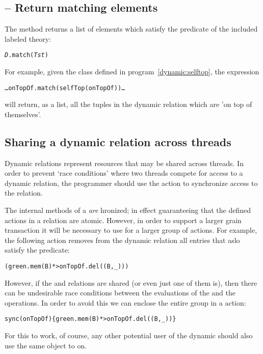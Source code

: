 \subsection{ -- Return matching elements}
\label{dynamic:match}
The  method returns a list of elements which satisfy the  predicate of the included  labeled theory:
\begin{alltt}
\emph{D}.match(\emph{Tst})
\end{alltt}
For example, given the  class defined in program~\vref{dynamic:selftop}, the expression
\begin{alltt}
\ldots{}onTopOf.match(selfTop(onTopOf))\ldots
\end{alltt}
will return, as a list, all the tuples in the  dynamic relation which are 'on top of themselves'.

\subsection{Sharing a dynamic relation across threads}
\label{dynamic:sharerel}

Dynamic relations represent resources that may be shared across threads. In order to prevent `race conditions' where two threads compete for access to a dynamic relation, the programmer should use the  action to synchronize access to the relation.

The internal methods of a  \emph{are} hronized; in effect guaranteeing that the defined actions in a  relation are atomic. However, in order to support a larger grain transaction it will be necessary to use  for a larger group of actions. For example, the following action removes from the  dynamic relation all entries that aslo satisfy the  predicate:
\begin{alltt}
(green.mem(B) *> onTopOf.del((B,\_)))
\end{alltt}
However, if the  and  relations are shared (or even just one of them is), then there can be undesirable race conditions between the evaluations of the  and the  operations.
In order to avoid this we can enclose the entire group in a  action:
\begin{alltt}
sync(onTopOf)\{green.mem(B) *> onTopOf.del((B,_))\}
\end{alltt}
For this to work, of course, any other potential user of the  dynamic should also use the same object to  on.
